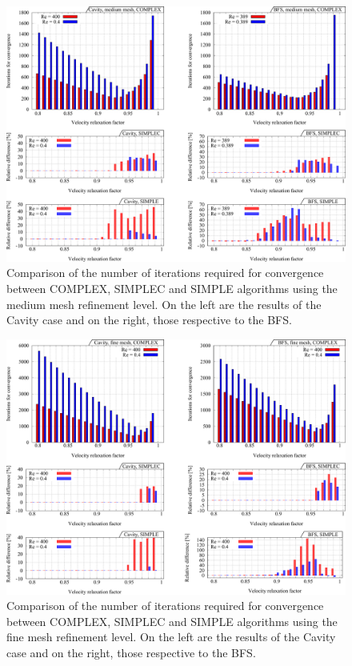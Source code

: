 \documentclass[final,3p,times,11pt,onecolumn]{myElsarticle}
\numberwithin{equation}{section}
\begin{document}
\begin{figure}[t!]
\centering
\includegraphics[width=17cm]{fig/Results/complexMedium.pdf}
\caption{Comparison of the number of iterations required for convergence between COMPLEX, SIMPLEC and SIMPLE algorithms using the medium mesh refinement level. On the left are the results of the Cavity case and on the right, those respective to the BFS.}
\label{Fig:complexMedium}
\end{figure}

\begin{figure}[t!]
\centering
\includegraphics[width=17cm]{fig/Results/complexFine.pdf}
\caption{Comparison of the number of iterations required for convergence between COMPLEX, SIMPLEC and SIMPLE algorithms using the fine mesh refinement level. On the left are the results of the Cavity case and on the right, those respective to the BFS.}
\label{Fig:complexFine}
\end{figure}
\end{document}
